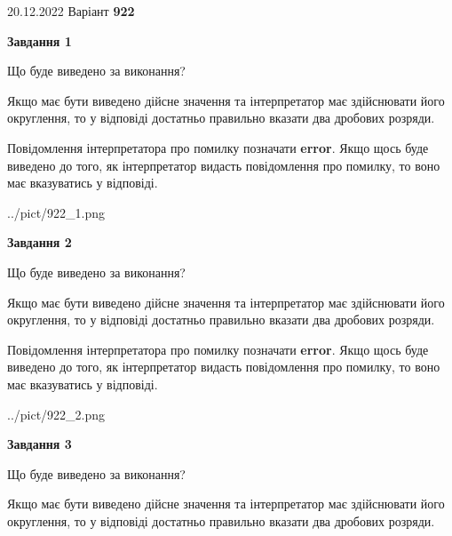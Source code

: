 \documentclass[12pt, ukrainian]{article}
\begin{document}
{20.12.2022 Варіант \No \textbf { 922 }\par}
{
\begin {Large}

{\begin {center}\textbf{Завдання 1}\end {center}}\par
Що буде виведено за виконання? \par

Якщо має бути виведено дійсне значення та інтерпретатор має здійснювати його округлення, 
то у відповіді достатньо правильно вказати два дробових розряди.

Повідомлення інтерпретатора про помилку позначати \textbf{error}.
Якщо щось буде виведено до того, як інтерпретатор видасть повідомлення про помилку, 
то воно має вказуватись у відповіді. \par

\begin{center}
	{../pict/922_1.png}
\end{center}
\newpage

{\begin {center}\textbf{Завдання 2}\end {center}}\par
Що буде виведено за виконання? \par

Якщо має бути виведено дійсне значення та інтерпретатор має здійснювати його округлення, 
то у відповіді достатньо правильно вказати два дробових розряди.

Повідомлення інтерпретатора про помилку позначати \textbf{error}.
Якщо щось буде виведено до того, як інтерпретатор видасть повідомлення про помилку, 
то воно має вказуватись у відповіді. \par

\begin{center}
	{../pict/922_2.png}
\end{center}
\newpage

{\begin {center}\textbf{Завдання 3}\end {center}}\par
Що буде виведено за виконання? \par

Якщо має бути виведено дійсне значення та інтерпретатор має здійснювати його округлення, 
то у відповіді достатньо правильно вказати два дробових розряди.


\end{Large}}
\end{document}
